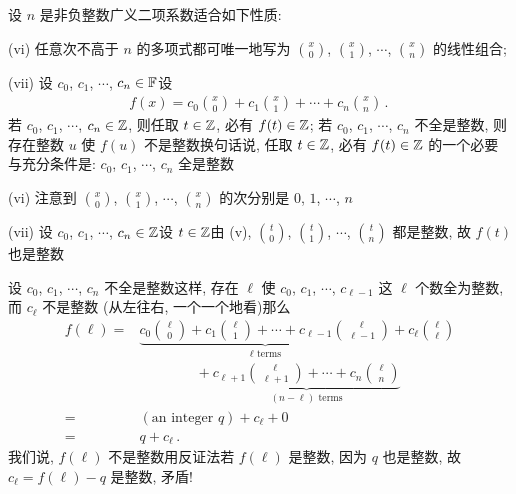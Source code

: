 \begin{proposition}
    设 $n$ 是非负整数\period 广义二项系数适合如下性质:

    (vi) 任意次不高于 $n$ 的多项式都可唯一地写为 $\binom{x}{0}$, $\binom{x}{1}$, $\cdots$, $\binom{x}{n}$ 的线性组合;

    (vii) 设 $c_0$, $c_1$, $\cdots$, $c_n \in \mathbb{F}$\period 设
    \begin{align*}
        f(x) = c_0 \binom{x}{0} + c_1 \binom{x}{1} + \cdots + c_n \binom{x}{n} \period
    \end{align*}
    若 $c_0$, $c_1$, $\cdots$, $c_n \in \mathbb{Z}$, 则任取 $t \in \mathbb{Z}$, 必有 $f(t) \in \mathbb{Z}$; 若 $c_0$, $c_1$, $\cdots$, $c_n$ 不全是整数, 则存在整数 $u$ 使 $f(u)$ 不是整数\period 换句话说, 任取 $t \in \mathbb{Z}$, 必有 $f(t) \in \mathbb{Z}$ 的一个必要与充分条件是: $c_0$, $c_1$, $\cdots$, $c_n$ 全是整数\period
\end{proposition}

\begin{pf}
    (vi) 注意到 $\binom{x}{0}$, $\binom{x}{1}$, $\cdots$, $\binom{x}{n}$ 的次分别是 $0$, $1$, $\cdots$, $n$\period

    (vii) 设 $c_0$, $c_1$, $\cdots$, $c_n \in \mathbb{Z}$\period 设 $t \in \mathbb{Z}$\period 由 (v), $\binom{t}{0}$, $\binom{t}{1}$, $\cdots$, $\binom{t}{n}$ 都是整数, 故 $f(t)$ 也是整数\period

    设 $c_0$, $c_1$, $\cdots$, $c_n$ 不全是整数\period 这样, 存在 $\ell$ 使 $c_0$, $c_1$, $\cdots$, $c_{\ell - 1}$ 这 $\ell$ 个数全为整数, 而 $c_{\ell}$ 不是整数 (从左往右, 一个一个地看)\period 那么
    \begin{align*}
        f(\ell)
        = {} & \underbrace{c_0 \binom{\ell}{0} + c_1 \binom{\ell}{1} + \cdots
            + c_{\ell - 1} \binom{\ell}{\ell - 1}}_{\text{$\ell$ terms}}
        {} + c_{\ell} \binom{\ell}{\ell}                                       \\
             & \qquad \qquad + \underbrace{c_{\ell + 1} \binom{\ell}{\ell + 1}
        + \cdots + c_{n} \binom{\ell}{n}}_{\text{$(n - \ell)$ terms}}          \\
        = {} & (\text{an integer $q$}) + c_{\ell} + 0                          \\
        = {} & q + c_{\ell} \period
    \end{align*}
    我们说, $f(\ell)$ 不是整数\period 用反证法\period 若 $f(\ell)$ 是整数, 因为 $q$ 也是整数, 故 $c_{\ell} = f(\ell) - q$ 是整数, 矛盾!
\end{pf}
